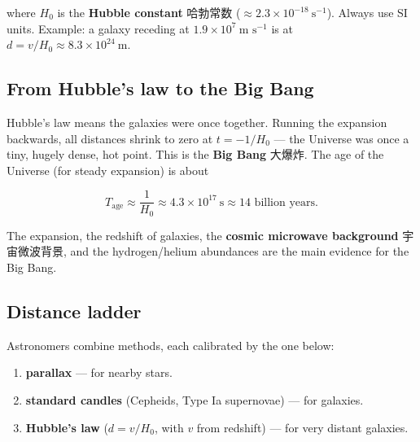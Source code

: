 \documentclass[11pt]{article}
\begin{document}
where $H_{0}$ is the \textbf{Hubble constant} 哈勃常数 ($\approx 2.3 \times 10^{-18}\ \text{s}^{-1}$). Always use SI units. Example: a galaxy receding at $1.9 \times 10^{7}\ \text{m s}^{-1}$ is at $d = v/H_{0} \approx 8.3 \times 10^{24}\ \text{m}$.

\subsection*{From Hubble's law to the Big Bang}

Hubble's law means the galaxies were once together. Running the expansion backwards, all distances shrink to zero at $t = -1/H_{0}$ — the Universe was once a tiny, hugely dense, hot point. This is the \textbf{Big Bang} 大爆炸. The age of the Universe (for steady expansion) is about

\[
T_{\text{age}} \approx \frac{1}{H_{0}} \approx 4.3 \times 10^{17}\ \text{s} \approx 14 \text{ billion years}.
\]

The expansion, the redshift of galaxies, the \textbf{cosmic microwave background} 宇宙微波背景, and the hydrogen/helium abundances are the main evidence for the Big Bang.

\subsection*{Distance ladder}

Astronomers combine methods, each calibrated by the one below:

\begin{enumerate}
\item \textbf{parallax} — for nearby stars.

\item \textbf{standard candles} (Cepheids, Type Ia supernovae) — for galaxies.

\item \textbf{Hubble's law} ($d = v/H_{0}$, with $v$ from redshift) — for very distant galaxies.

\end{enumerate}
\end{document}
